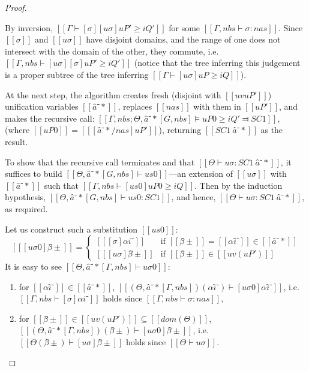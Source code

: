 \begin{proof}
\begin{caseof}
      By inversion, $[[ Γ ⊢ [σ][uσ]uP' ≥ iQ' ]]$ for some $[[Γ, nbs ⊢ σ : nas]]$.
      Since $[[σ]]$ and $[[uσ]]$ have disjoint domains,
      and the range of one does not intersect with the domain of the other,
      they commute, i.e. $[[ Γ, nbs ⊢ [uσ][σ]uP' ≥ iQ' ]]$
      (notice that the tree inferring this judgement is 
      a proper subtree of the tree inferring 
      $[[ Γ ⊢ [uσ]uP ≥ iQ ]]$).

      At the next step, 
      the algorithm creates fresh (disjoint with $[[uv uP']]$) 
      unification variables $[[â⁻*]]$, replaces $[[nas]]$ with them in $[[ uP' ]]$,
      and makes the recursive call:
      $[[Γ, nbs; Θ, â⁻*[G, nbs] ⊨ uP0 ≥ iQ' ⫤ SC1]]$,
      (where $[[uP0]] = [[ [â⁻*/nas]uP' ]]$),
      returning $[[SC1 \ {â⁻*}]]$ as the result.

      To show that the recursive call terminates and that 
      $[[Θ ⊢ uσ : SC1 \ {â⁻*}]]$,
      it suffices to build $[[Θ, â⁻*[G, nbs] ⊢ us0]]$---an extension of $[[uσ]]$ with
      $[[â⁻*]]$ such that $[[Γ, nbs ⊢ [us0]uP0 ≥ iQ]]$.
      Then by the induction hypothesis, $[[Θ, â⁻*[G, nbs] ⊢ us0 : SC1]]$,
      and hence, $[[Θ ⊢ uσ : SC1 \ {â⁻*}]]$, as required.

      Let us construct such a substitution $[[us0]]$:
        \[
            [[ [uσ0]β̂± ]]  = 
            \begin{cases}
               [[ [σ]αi⁻ ]] & \text{if } [[β̂±]] = [[αî⁻]] \in [[â⁻*]] \\
               [[ [uσ]β̂± ]] & \text{if } [[β̂±]] \in [[ uv(uP') ]]
            \end{cases}
       \]
       It is easy to see $[[Θ, â⁻*[Γ, nbs] ⊢ uσ0]]$:
       \begin{enumerate}
            \item for $[[αî⁻]] \in [[â⁻*]]$, $[[ (Θ, â⁻*[Γ, nbs])(αî⁻) ⊢ [uσ0] αî⁻]]$, 
            i.e. $[[ Γ, nbs ⊢ [σ]αi⁻ ]]$ holds since $[[Γ, nbs ⊢ σ : nas]]$,
            \item for $[[β̂±]] \in [[ uv(uP') ]] \subseteq [[dom(Θ)]]$, $[[ (Θ, â⁻*[Γ, nbs])(β̂±) ⊢ [uσ0] β̂± ]]$,
            i.e. $[[Θ(β̂±) ⊢ [uσ] β̂± ]]$ holds since $[[Θ ⊢ uσ]]$.
       \end{enumerate}


\end{caseof}
\end{proof}

